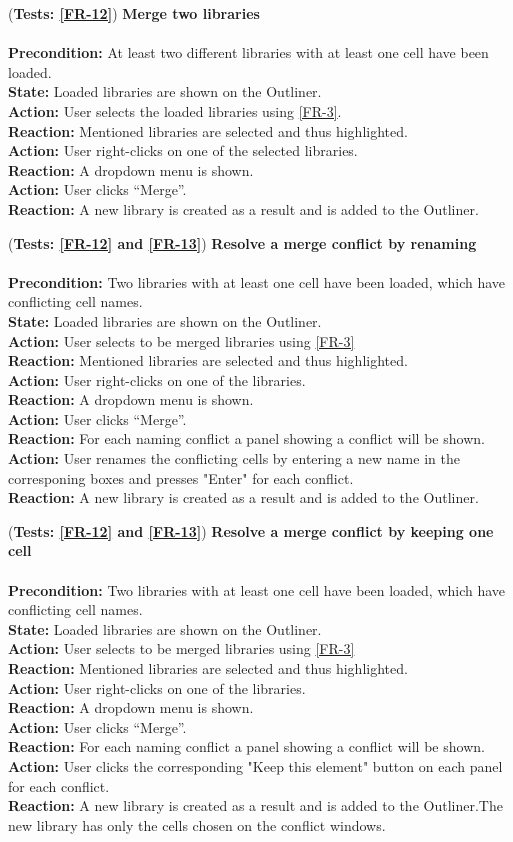 \documentclass[10pt,a4paper]{report}
\newcommand{\precondition}[1]{
    \textbf{Precondition: } #1 \leavevmode \\
}
\newcommand{\action}[1]{
    \textbf{Action: } #1 \leavevmode \\
}
\newcommand{\state}[1]{
    \textbf{State: } #1 \leavevmode \\
}
\newcommand{\reaction}[1]{
    \textbf{Reaction: } #1 \leavevmode \\
}
\newcommand{\GTCDescription}[2]{
    (\textbf{Tests: #1}) \textbf{#2} \leavevmode \\
}
\begin{document}
\begin{GTC}
    \item \GTCDescription{\ref{FR-12}}
    {Merge two libraries} \leavevmode \\ 
        \precondition{At least two different libraries with at least one cell have been loaded.}
        \state{Loaded libraries are shown on the Outliner.}
        \action{User selects the loaded libraries using \ref{FR-3}.}
        \reaction{Mentioned libraries are selected and thus highlighted.}
        \action{User right-clicks on one of the selected libraries.}
        \reaction{A dropdown menu is shown.}
        \action{User clicks “Merge”.}
        \reaction{A new library is created as a result and is added to the Outliner.}\label{GTC-27}
        
    
    \item \GTCDescription{\ref{FR-12} and \ref{FR-13}}
    {Resolve a merge conflict by renaming} \leavevmode \\ 
        \precondition{Two libraries with at least one cell have been loaded, which have conflicting cell names.}
        \state{Loaded libraries are shown on the Outliner.}
        \action{User selects to be merged libraries using \ref{FR-3}}
        \reaction{Mentioned libraries are selected and thus highlighted.}
        \action{User right-clicks on one of the libraries.}
        \reaction{A dropdown menu is shown.}
        \action{User clicks “Merge”.}
        \reaction{For each naming conflict a panel showing a conflict will be shown.}
        \action{User renames the conflicting cells by entering a new name in the corresponing boxes and presses "Enter" for each conflict.}
        \reaction{A new library is created as a result and is added to the Outliner.}\label{GTC-28}
        
    \item \GTCDescription{\ref{FR-12} and \ref{FR-13}}
    {Resolve a merge conflict by keeping one cell} \leavevmode \\ 
        \precondition{Two libraries with at least one cell have been loaded, which have conflicting cell names.}
        \state{Loaded libraries are shown on the Outliner.}
        \action{User selects to be merged libraries using \ref{FR-3}}
        \reaction{Mentioned libraries are selected and thus highlighted.}
        \action{User right-clicks on one of the libraries.}
        \reaction{A dropdown menu is shown.}
        \action{User clicks “Merge”.}
        \reaction{For each naming conflict a panel showing a conflict will be shown.}
        \action{User clicks the corresponding "Keep this element" button on each panel for each conflict.}
        \reaction{A new library is created as a result and is added to the Outliner.The new library has only the cells chosen on the conflict windows.}\label{GTC-29}
    

\end{GTC}
\end{document}
